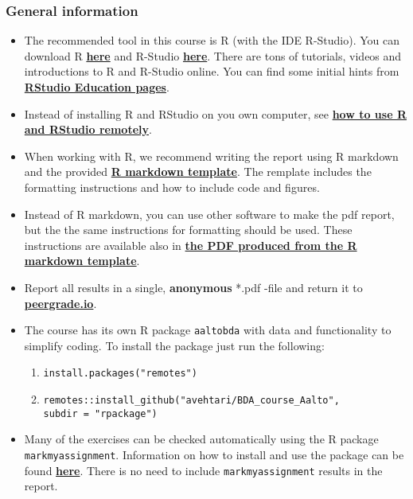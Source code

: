 
\subsubsection*{General information}


\begin{itemize}
\itemsep0em
\item The recommended tool in this course is R (with the IDE R-Studio). You can download R \href{https://cran.r-project.org/}{\textbf{here}} and R-Studio \href{https://www.rstudio.com/products/rstudio/download/}{\textbf{here}}. There are tons of tutorials, videos and introductions to R and R-Studio online. You can find some initial hints from \href{https://education.rstudio.com/}{\textbf{RStudio Education pages}}.
\item Instead of installing R and RStudio on you own computer, see \href{https://avehtari.github.io/BDA_course_Aalto/FAQ.html#How_to_use_R_and_RStudio_remotely}{\textbf{how to use R and RStudio remotely}}.
\item When working with R, we recommend writing the report using R markdown and the provided \href{https://raw.githubusercontent.com/avehtari/BDA_course_Aalto/master/templates/assignment_template.rmd}{\textbf{R markdown template}}. The remplate includes the formatting instructions and how to include code and figures.
\item Instead of R markdown, you can use other software to make the pdf report, but the the same instructions for formatting should be used. These instructions are available also in \href{https://raw.githubusercontent.com/avehtari/BDA_course_Aalto/master/templates/assignment_template.pdf}{\textbf{the PDF produced from the R markdown template}}.
\item  Report all results in a single, {\bf anonymous} *.pdf -file and return it to \href{peergrade.io}{\textbf{peergrade.io}}.
\item The course has its own R package \texttt{aaltobda} with data and functionality to simplify coding. To install the package just run the following:
\begin{enumerate}
\item \texttt{install.packages("remotes")}
\item \texttt{remotes::install\_github("avehtari/BDA\_course\_Aalto", \\ subdir = "rpackage")}
\end{enumerate}
\item Many of the exercises can be checked automatically using the R package \\ \texttt{markmyassignment}. Information on how to install and use the package can be found \href{https://cran.r-project.org/web/packages/markmyassignment/vignettes/markmyassignment.html}{\textbf{here}}. There is no need to include \texttt{markmyassignment} results in the report.

\end{itemize}
